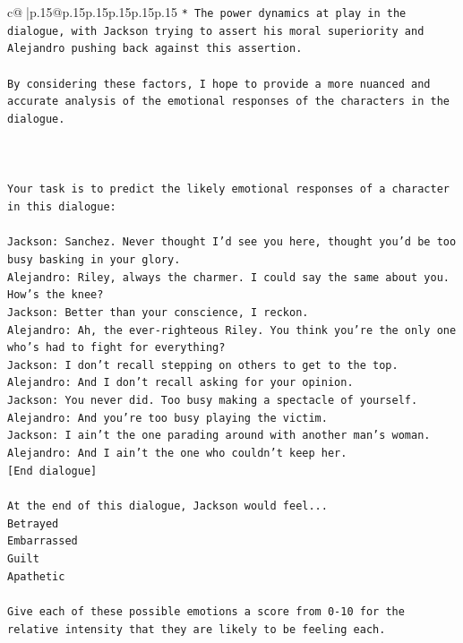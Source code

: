 \documentclass{article}
\begin{document}
{\begin{supertabular}{c@{$\;$}|p{.15\linewidth}@{}p{.15\linewidth}p{.15\linewidth}p{.15\linewidth}p{.15\linewidth}p{.15\linewidth}}
{{{\texttt{* The power dynamics at play in the dialogue, with Jackson trying to assert his moral superiority and Alejandro pushing back against this assertion.} \\
\\ 
\texttt{By considering these factors, I hope to provide a more nuanced and accurate analysis of the emotional responses of the characters in the dialogue.} \\
\\ 
\\ 
\\ 
\texttt{Your task is to predict the likely emotional responses of a character in this dialogue:} \\
\\ 
\texttt{Jackson: Sanchez. Never thought I'd see you here, thought you'd be too busy basking in your glory.} \\
\texttt{Alejandro: Riley, always the charmer. I could say the same about you. How's the knee?} \\
\texttt{Jackson: Better than your conscience, I reckon.} \\
\texttt{Alejandro: Ah, the ever{-}righteous Riley. You think you're the only one who's had to fight for everything?} \\
\texttt{Jackson: I don't recall stepping on others to get to the top.} \\
\texttt{Alejandro: And I don't recall asking for your opinion.} \\
\texttt{Jackson: You never did. Too busy making a spectacle of yourself.} \\
\texttt{Alejandro: And you're too busy playing the victim. } \\
\texttt{Jackson: I ain't the one parading around with another man's woman.} \\
\texttt{Alejandro: And I ain't the one who couldn't keep her.} \\
\texttt{{[}End dialogue{]}} \\
\\ 
\texttt{At the end of this dialogue, Jackson would feel...} \\
\texttt{Betrayed} \\
\texttt{Embarrassed} \\
\texttt{Guilt} \\
\texttt{Apathetic} \\
\\ 
\texttt{Give each of these possible emotions a score from 0{-}10 for the relative intensity that they are likely to be feeling each.} \\
}}}
\end{supertabular}}
\end{document}
